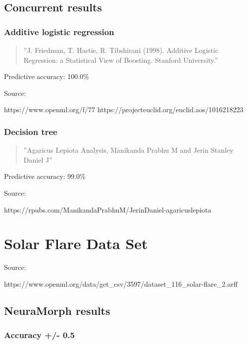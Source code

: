 \documentclass[8pt, a4paper]{article}
\begin{document}


\subsection{Concurrent results}

\subsubsection{Additive logistic regression}

\begin{quote}
''J. Friedman, T. Hastie, R. Tibshirani (1998). Additive Logistic Regression: a Statistical View of Boosting. Stanford University.''
\end{quote}

Predictive accuracy: 100.0\%

Source:

https://www.openml.org/f/77
https://projecteuclid.org/euclid.aos/1016218223

\subsubsection{Decision tree}

\begin{quote}
''Agaricus Lepiota Analysis, Manikanda Prabhu M and Jerin Stanley Daniel J''
\end{quote}

Predictive accuracy: 99.0\%

Source:

https://rpubs.com/ManikandaPrabhuM/JerinDaniel-agaricuslepiota



\newpage
\section{Solar Flare Data Set}

Source: 

https://www.openml.org/data/get\_csv/3597/dataset\_116\_solar-flare\_2.arff

\subsection{NeuraMorph results}

\subsubsection{Accuracy +/- 0.5}
\end{document}
